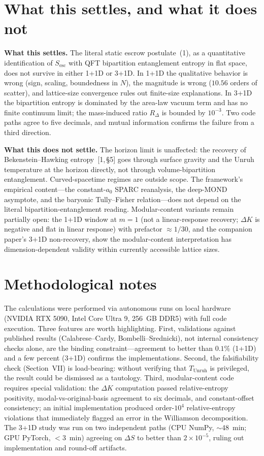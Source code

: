 \documentclass[11pt]{article}
\newcommand{\Sesc}{S_{\mathrm{esc}}}
\newcommand{\Tu}{T_{\mathrm{Unruh}}}
\begin{document}
\section{What this settles, and what it does not}
\textbf{What this settles.} The literal static escrow postulate~(1), as a quantitative identification of
$\Sesc$ with QFT bipartition entanglement entropy in flat space, does not survive in either 1+1D or
3+1D. In 1+1D the qualitative behavior is wrong (sign, scaling, boundedness in $N$), the magnitude is
wrong ($10.56$ orders of scatter), and lattice-size convergence rules out finite-size explanations. In
3+1D the bipartition entropy is dominated by the area-law vacuum term and has no finite continuum
limit; the mass-induced ratio $R_{\Delta}$ is bounded by $10^{-3}$. Two code paths agree to five
decimals, and mutual information confirms the failure from a third direction.

\textbf{What this does not settle.} The horizon limit is unaffected: the recovery of Bekenstein--Hawking
entropy~[1,\,\S5] goes through surface gravity and the Unruh temperature at the horizon directly, not
through volume-bipartition entanglement. Curved-spacetime regimes are outside scope. The framework's
empirical content---the constant-$a_{0}$ SPARC reanalysis, the deep-MOND asymptote, and the baryonic
Tully--Fisher relation---does not depend on the literal bipartition-entanglement reading. Modular-content
variants remain partially open: the 1+1D window at $m=1$ (not a linear-response recovery; $\Delta K$ is
negative and flat in linear response) with prefactor $\approx 1/30$, and the companion paper's 3+1D
non-recovery, show the modular-content interpretation has dimension-dependent validity within currently
accessible lattice sizes.

\section{Methodological notes}
The calculations were performed via autonomous runs on local hardware (NVIDIA RTX 5090, Intel Core
Ultra 9, 256~GB DDR5) with full code execution. Three features are worth highlighting. First,
validations against published results (Calabrese--Cardy, Bombelli--Srednicki), not internal consistency
checks alone, are the binding constraint---agreement to better than $0.1\%$ (1+1D) and a few percent
(3+1D) confirms the implementations. Second, the falsifiability check (Section~VII) is load-bearing:
without verifying that $\Tu$ is privileged, the result could be dismissed as a tautology. Third,
modular-content code requires special validation: the $\Delta K$ computation passed relative-entropy
positivity, modal-vs-original-basis agreement to six decimals, and constant-offset consistency; an initial
implementation produced order-$10^{4}$ relative-entropy violations that immediately flagged an error in
the Williamson decomposition. The 3+1D study was run on two independent paths (CPU NumPy,
$\sim$48~min; GPU PyTorch, $<$3~min) agreeing on $\Delta S$ to better than $2\times 10^{-5}$, ruling out
implementation and round-off artifacts.
\end{document}
